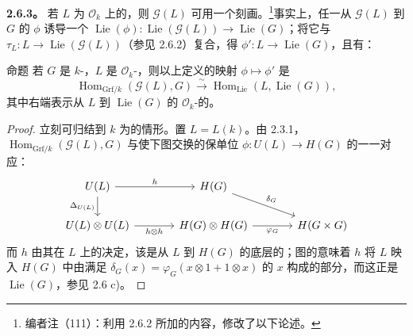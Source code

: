 \textbf{2.6.3。} 若 $L$ 为 $\mathscr O_k$ 上的，则 $\mathscr G(L)$ 可用一个刻画。\footnote{编者注（111）：利用 2.6.2 所加的内容，修改了以下论述。}事实上，任一从 $\mathscr G(L)$ 到 $G$ 的 $\phi$ 诱导一个 $\operatorname{Lie}(\phi):\operatorname{Lie}(\mathscr G(L))\to\operatorname{Lie}(G)$；将它与 $\tau_L:L\to\operatorname{Lie}(\mathscr G(L))$（参见 2.6.2）复合，得 $\phi':L\to\operatorname{Lie}(G)$，且有：
\begin{SGAresult}{命题}{}
若 $G$ 是 $k$-，$L$ 是 $\mathscr O_k$-，则以上定义的映射 $\phi\mapsto\phi'$ 是
\[
\operatorname{Hom}_{\mathrm{Grf}/k}(\mathscr G(L),G)\xrightarrow{\sim}\operatorname{Hom}_{\mathrm{Lie}}(L,\operatorname{Lie}(G)),
\]
其中右端表示从 $L$ 到 $\operatorname{Lie}(G)$ 的 $\mathscr O_k$-的。
\end{SGAresult}
\begin{proof}
立刻可归结到 $k$ 为的情形。置 $L=L(k)$。由 2.3.1，$\operatorname{Hom}_{\mathrm{Grf}/k}(\mathscr G(L),G)$ 与使下图交换的保单位 $\phi:U(L)\to H(G)$ 的一一对应：
\[
\begin{tikzcd}[column sep=large]
U(L)\arrow[r,"h"]\arrow[d,"\Delta_{U(L)}"']&H(G)\arrow[dr,"\delta_G"]&\\
U(L)\otimes U(L)\arrow[r,"h\otimes h"']&H(G)\otimes H(G)\arrow[r,"\varphi_G"']&H(G\times G)
\end{tikzcd}
\]
而 $h$ 由其在 $L$ 上的决定，该是从 $L$ 到 $H(G)$ 的底层的；图的意味着 $h$ 将 $L$ 映入 $H(G)$ 中由满足 $\delta_G(x)=\varphi_G(x\otimes1+1\otimes x)$ 的 $x$ 构成的部分，而这正是 $\operatorname{Lie}(G)$，参见 2.6 c)。
\end{proof}

